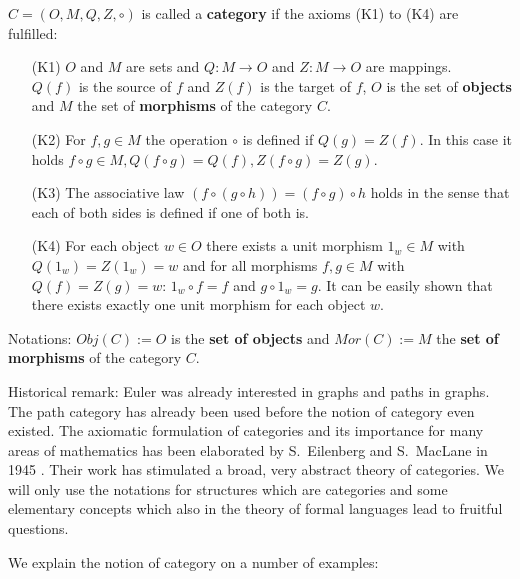 \begin{definition}[category]
$C = (O, M, Q, Z, \circ)$ is called a {\bf category} if the axioms (K1) to
(K4) are fulfilled:
\begin{enumerate}
  \item[(K1)] $O$ and $M$ are sets and $Q: M \to O$ and $Z: M \to O$ are
  mappings.\\
  $Q(f)$ is the source of $f$ and $Z(f)$ is the target of $f$, $O$ is the set of
  {\bf objects} and $M$ the set of {\bf morphisms} of the category $C$.
  \item[(K2)] For $f, g \in M$ the operation $\circ$ is defined if $Q(g) =
  Z(f)$. In this case it holds $f \circ g \in M, Q(f \circ g) = Q(f), Z(f
  \circ g) = Z(g)$.
  \item[(K3)] The associative law $(f \circ (g \circ h)) = (f \circ g) \circ h$
  holds in the sense that each of both sides is defined if one of both is.
  \item[(K4)] For each object $w \in O$ there exists a unit morphism $1_w \in M$
  with $Q(1_w) = Z(1_w) = w$ and for all morphisms $f, g \in M$ with $Q(f) =
  Z(g) = w$: $1_w \circ f = f$ and $g \circ 1_w = g$. It can be easily shown
  that there exists exactly one unit morphism for each object $w$.
\end{enumerate}
\end{definition}


Notations: $Obj(C) := O$ is the {\bf set of objects} and $Mor(C) := M$ the
{\bf set of morphisms} of the category $C$.

Historical remark: Euler was already interested in graphs and paths in graphs.
The path category has already been used before the notion of category even
existed. The axiomatic formulation of categories and its importance for many
areas of mathematics has been elaborated by S.\ Eilenberg and S.\ MacLane in
1945 \cite{EiMa}. Their work has stimulated a broad, very abstract theory of
categories. We will only use the notations for structures which are categories
and some elementary concepts which also in the theory of formal languages lead
to fruitful questions.

We explain the notion of category on a number of examples:

